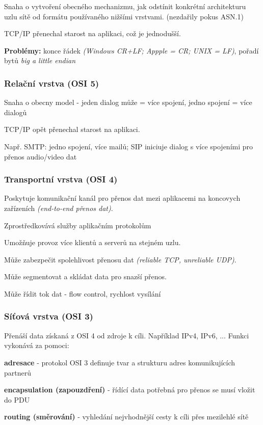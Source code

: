 \documentclass[10pt,a4paper]{article}
\begin{document}
Snaha o vytvoření obecného mechanizmu, jak odstínit konkrétní architekturu uzlu sítě od formátu používaného nižšími vrstvami. (nezdařily pokus ASN.1)

TCP/IP přenechal starost na aplikaci, což je jednodušší.

\textbf{Problémy:} konce řádek \textit{(Windows CR+LF; Appple = CR; UNIX = LF)}, pořadí bytů \textit{big a little endian}

\subsubsection{Relační vrstva (OSI 5)}

Snaha o obecny model - jeden dialog může = více spojení, jedno spojení = více dialogů

TCP/IP opět přenechal starost na aplikaci. 

Např. SMTP: jedno spojení, více mailů; SIP iniciuje dialog s více spojeními pro přenos audio/video dat

\subsubsection{Transportní vrstva (OSI 4)}

Poskytuje komunikační kanál pro přenos dat mezi aplikacemi na koncovych zařízeních \textit{(end-to-end přenos dat)}.

Zprostředkovává služby aplikačním protokolům

Umožňuje provoz více klientů a serverů na stejném uzlu.

Může zabezpečit spolehlivost přenosu dat \textit{(reliable TCP, unreliable UDP)}.

Může segmentovat a skládat data pro snazší přenos.

Může řídit tok dat - flow control, rychlost vysílání

\subsubsection{Síťová vrstva (OSI 3)}

Přenáší data získaná z OSI 4 od zdroje k cíli. Například IPv4, IPv6, ... Funkci vykonává za pomoci:

\textbf{adresace} - protokol OSI 3 definuje tvar a strukturu adres komunikujících partnerů

\textbf{encapsulation (zapouzdření)} - řídící data potřebná pro přenos se musí vložit do PDU

\textbf{routing (směrování)} - vyhledání nejvhodnější cesty k cíli přes mezilehlé sítě
\end{document}
